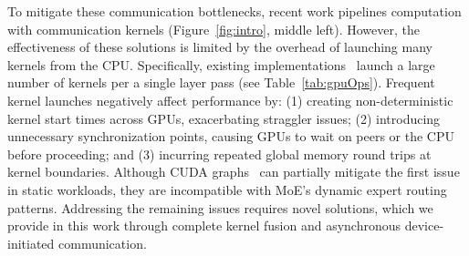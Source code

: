 
To mitigate these communication bottlenecks, recent work pipelines computation with communication kernels (Figure~\ref{fig:intro}, middle left). However, the effectiveness of these solutions is limited by the overhead of launching many kernels from the CPU. 
Specifically, existing implementations~\cite{pmlr-v162-rajbhandari22a, comet, megatron, fastermoe} launch a large number of kernels per a single layer pass (see Table~\ref{tab:gpuOps}). Frequent kernel launches negatively affect performance by:
(1) creating non-deterministic kernel start times across GPUs, exacerbating straggler issues; (2) introducing unnecessary synchronization points, causing GPUs to wait on peers or the CPU before proceeding; and (3) incurring repeated global memory round trips at kernel boundaries. Although CUDA graphs~\cite{cuda_graphs_nvidia_blog} can partially mitigate the first issue in static workloads, they are incompatible with MoE's dynamic expert routing patterns. Addressing the remaining issues requires novel solutions,
which we provide in this work through complete kernel fusion and asynchronous device-initiated communication.


